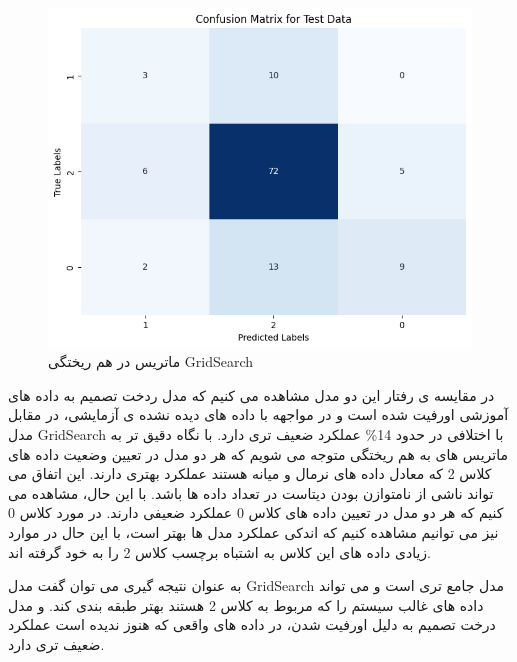 \documentclass{article}
\begin{document}
\begin{itemize}
\begin{figure}
    \centering
    \includegraphics[width=0.75\linewidth]{GridReport.png}
    \caption{ماتریس در هم ریختگی GridSearch}
    \label{fig:enter-label}
\end{figure}
\end{itemize}

در مقایسه ی رفتار این دو مدل مشاهده می کنیم که مدل ردخت تصمیم به داده های آموزشی اورفیت شده است و در مواجهه با داده های دیده نشده ی آزمایشی، در مقابل مدل GridSearch با اختلافی در حدود 14\% عملکرد ضعیف تری دارد.
با نگاه دقیق تر به ماتریس های به هم ریختگی متوجه می شویم که هر دو مدل در تعیین وضعیت داده های کلاس 2 که معادل داده های نرمال و میانه هستند عملکرد بهتری دارند. این اتفاق می تواند ناشی از نامتوازن بودن دیتاست در تعداد داده ها باشد. با این حال، مشاهده می کنیم که هر دو مدل در تعیین داده های کلاس 0 عملکرد ضعیفی دارند. در مورد کلاس 0 نیز می توانیم مشاهده کنیم که اندکی عملکرد مدل ها بهتر است، با این حال در موارد زیادی داده های این کلاس به اشتباه برچسب کلاس 2 را به خود گرفته اند. 

به عنوان نتیجه گیری می توان گفت مدل GridSearch مدل جامع تری است و می تواند داده های غالب سیستم را که مربوط به کلاس 2 هستند بهتر طبقه بندی کند. و مدل درخت تصمیم به دلیل اورفیت شدن، در داده های واقعی که هنوز ندیده است عملکرد ضعیف تری دارد.
\end{document}
